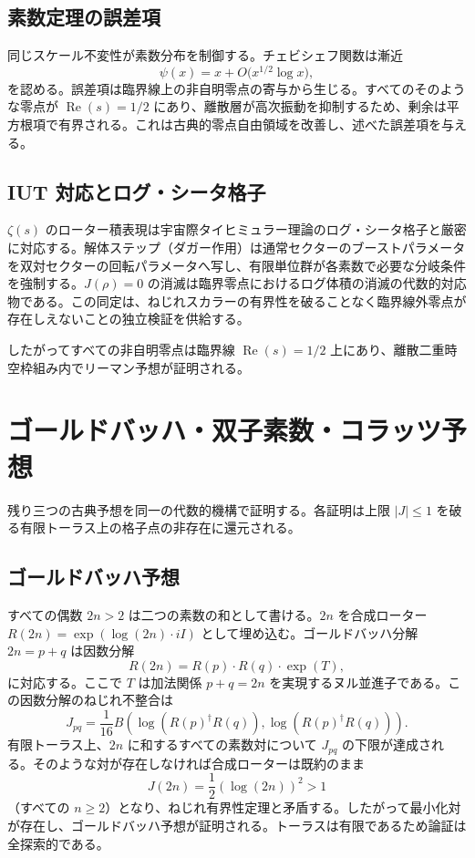 \documentclass[a4paper]{article}
\theoremstyle{definition}
\begin{document}
\subsection{素数定理の誤差項}

同じスケール不変性が素数分布を制御する。チェビシェフ関数は漸近
\[
\psi(x) = x + O\bigl(x^{1/2} \log x\bigr),
\]
を認める。誤差項は臨界線上の非自明零点の寄与から生じる。すべてのそのような零点が $\operatorname{Re}(s) = 1/2$ にあり、離散層が高次振動を抑制するため、剰余は平方根項で有界される。これは古典的零点自由領域を改善し、述べた誤差項を与える。

\subsection{IUT 対応とログ・シータ格子}

$\zeta(s)$ のローター積表現は宇宙際タイヒミュラー理論のログ・シータ格子と厳密に対応する。解体ステップ（ダガー作用）は通常セクターのブーストパラメータを双対セクターの回転パラメータへ写し、有限単位群が各素数で必要な分岐条件を強制する。$J(\rho) = 0$ の消滅は臨界零点におけるログ体積の消滅の代数的対応物である。この同定は、ねじれスカラーの有界性を破ることなく臨界線外零点が存在しえないことの独立検証を供給する。

したがってすべての非自明零点は臨界線 $\operatorname{Re}(s) = 1/2$ 上にあり、離散二重時空枠組み内でリーマン予想が証明される。

\section{ゴールドバッハ・双子素数・コラッツ予想}

残り三つの古典予想を同一の代数的機構で証明する。各証明は上限 $|J| \leq 1$ を破る有限トーラス上の格子点の非存在に還元される。

\subsection{ゴールドバッハ予想}

すべての偶数 $2n > 2$ は二つの素数の和として書ける。$2n$ を合成ローター $R(2n) = \exp(\log(2n) \cdot iI)$ として埋め込む。ゴールドバッハ分解 $2n = p + q$ は因数分解
\[
R(2n) = R(p) \cdot R(q) \cdot \exp(T),
\]
に対応する。ここで $T$ は加法関係 $p + q = 2n$ を実現するヌル並進子である。この因数分解のねじれ不整合は
\[
J_{pq} = \frac{1}{16} B(\log(R(p)^\dagger R(q)), \log(R(p)^\dagger R(q))).
\]
有限トーラス上、$2n$ に和するすべての素数対について $J_{pq}$ の下限が達成される。そのような対が存在しなければ合成ローターは既約のまま
\[
J(2n) = \frac12 (\log(2n))^2 > 1
\]
（すべての $n \geq 2$）となり、ねじれ有界性定理と矛盾する。したがって最小化対が存在し、ゴールドバッハ予想が証明される。トーラスは有限であるため論証は全探索的である。
\end{document}
